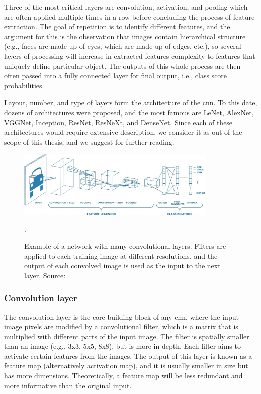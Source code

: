         Three of the most critical layers are convolution, activation, and pooling which are often applied multiple times in a row before concluding the process of feature extraction. The goal of repetition is to identify different features, and the argument for this is the observation that images contain hierarchical structure (e.g., faces are made up of eyes, which are made up of edges, etc.), so several layers of processing will increase in extracted features complexity to features that uniquely define particular object. The outputs of this whole process are then often passed into a fully connected layer for final output, i.e., class score probabilities. 
        
        Layout, number, and type of layers form the architecture of the \gls{cnn}. To this date, dozens of architectures were proposed, and the most famous are LeNet, AlexNet, VGGNet, Inception, ResNet, ResNeXt, and DenseNet. Since each of these architectures would require extensive description, we consider it as out of the scope of this thesis, and we suggest \cite{cs231n, dascnnoverview, jordancnnoverview} for further reading. 

        \begin{figure}[ht]
            \centering
            \includegraphics[width=0.85\textwidth]{resources/convolutional-neural-network.png}
            \caption{Example of a network with many convolutional layers. Filters are applied to each training image at different resolutions, and the output of each convolved image is used as the input to the next layer. Source: \cite{mathworkscnn}}.
            \label{fig:convolutional neural netwok}
        \end{figure}
        
        \subsubsection{Convolution layer}
            The convolution layer is the core building block of any \gls{cnn}, where the input image pixels are modified by a convolutional filter, which is a matrix that is multiplied with different parts of the input image. The filter is spatially smaller than an image (e.g., 3x3, 5x5, 8x8), but is more in-depth. Each filter aims to activate certain features from the images. The output of this layer is known as a feature map (alternatively activation map), and it is usually smaller in size but has more dimensions. Theoretically, a feature map will be less redundant and more informative than the original input.
            
